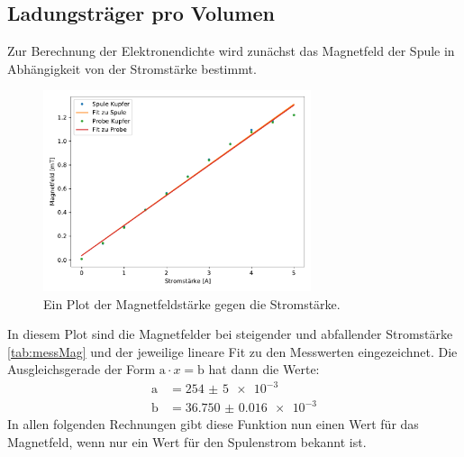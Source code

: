      
    \subsection{Ladungsträger pro Volumen}


    Zur Berechnung der Elektronendichte wird zunächst das Magnetfeld der Spule in Abhängigkeit von der Stromstärke bestimmt.

    \begin{figure}[H]
        \centering
        \includegraphics[width=0.7\textwidth]{build/Magnetfeld.pdf}
        \caption{Ein Plot der Magnetfeldstärke gegen die Stromstärke.}
        \label{img:Magnetfeld}
    \end{figure}
    \noindent
    In diesem Plot sind die Magnetfelder bei steigender und abfallender Stromstärke \ref{tab:messMag} und der jeweilige lineare Fit zu den 
    Messwerten eingezeichnet.
    Die Ausgleichsgerade der Form $\text{a}\cdot x = \text{b}$ hat dann die Werte:
    \begin{align}
        \text{a} & = \num{254(5)e-3}\\
        \text{b} & = \num{36.750(16)e-3}
    \end{align}
    In allen folgenden Rechnungen gibt diese Funktion nun einen Wert für das Magnetfeld, wenn nur ein Wert für den Spulenstrom bekannt ist.

